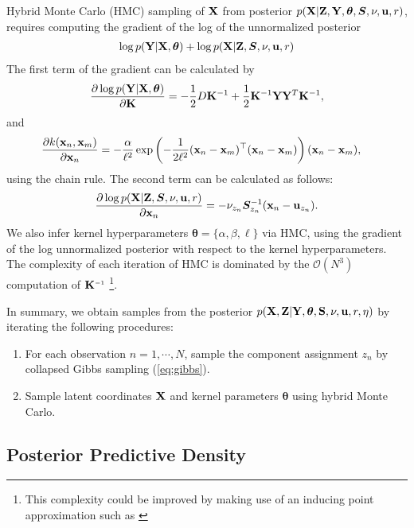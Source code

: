 Hybrid Monte Carlo (HMC) sampling of $\mathbf{X}$ from posterior 
${p(\mathbf{X}|\mathbf{Z},\mathbf{Y},\bm{\theta},\bm{S},\nu,{\bf{u}},r)}$,
requires computing the gradient of the log of the unnormalized posterior
%
\begin{align}
\log p(\mathbf{Y}|\mathbf{X},\bm{\theta})+  \log p(\mathbf{X}|\mathbf{Z},\bm{S},\nu,{\bf{u}},r)
\end{align}
%
The first term of the gradient can be calculated by
\begin{align}
\frac{\partial \log p(\mathbf{Y} | \mathbf{X},\bm{\theta})}{\partial \mathbf{K}} = -\frac{1}{2}D\mathbf{K}^{-1}+\frac{1}{2}\mathbf{K}^{-1} \mathbf{Y} \mathbf{Y}^{T} \mathbf{K}^{-1}, 
\end{align}
and
\begin{align}
\frac{\partial k({\bf{x}}_{n},{\bf{x}}_{m})}{\partial {\bf{x}}_n}
 & = -\frac{\alpha}{\ell^2} \exp \left( - \frac{1}{2 \ell^2} ({\bf{x}}_n - {\bf{x}}_m)^{\top} ({\bf{x}}_n - {\bf{x}}_m) \right) ({\bf{x}}_n - {\bf{x}}_m),
\end{align}
using the chain rule.
The second term can be calculated as follows:
\begin{align}
\frac{\partial \log p(\mathbf{X}|\mathbf{Z},\bm{S},\nu,{\bf{u}},r)}{\partial {\bf{x}}_{n}} 
= -\nu_{z_{n}}\bm{S}_{z_{n}}^{-1}({\bf{x}}_{n}-{\bf{u}}_{z_{n}}).
\end{align}
We also infer kernel hyperparameters $\bm{\theta}=\{\alpha,\beta,\ell\}$ via HMC, using the gradient of the log unnormalized posterior with respect to the kernel hyperparameters.
The complexity of each iteration of HMC is dominated by the $\mathcal{O}(N^3)$ computation of $\vK\inv$
\footnote{This complexity could be improved by making use of an inducing point approximation such as \cite{quinonero2005unifying,snelson2006sparse}}.


In summary, we obtain samples from the posterior $p(\mathbf{X},\mathbf{Z}|\mathbf{Y},\bm{\theta},\mathbf{S},\nu,{\bf{u}},r,\eta)$ 
by iterating the following procedures:
\begin{enumerate}
\item For each observation $n=1,\cdots,N$,
sample the component assignment $z_{n}$ by collapsed Gibbs sampling (\ref{eq:gibbs}).
\item Sample latent coordinates $\mathbf{X}$ and kernel parameters $\bm{\theta}$ using hybrid Monte Carlo.
\end{enumerate}


\subsection{Posterior Predictive Density}

